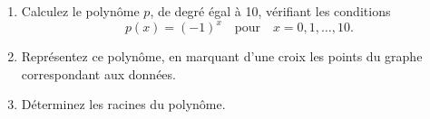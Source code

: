 \begin{exercice}\label{exoMatlab0023}

\begin{enumerate}
\item Calculez le polynôme $p$, de degré égal à 10, vérifiant les conditions 
\[ p(x) = (-1)^x \quad \textrm{pour} \quad x=0,1,\dots,10. \]
\item Représentez ce polynôme, en marquant d'une croix les points du graphe correspondant aux données.
\item Déterminez les racines du polynôme.
\end{enumerate}

\end{exercice}
